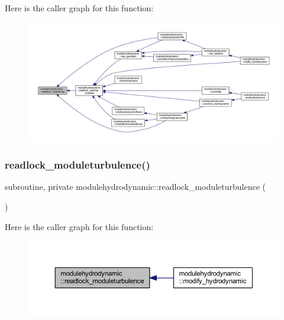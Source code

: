 Here is the caller graph for this function\+:\nopagebreak
\begin{figure}[H]
\begin{center}
\leavevmode
\includegraphics[width=350pt]{namespacemodulehydrodynamic_aefa0a7b600df8e249667d3541b45ecf1_icgraph}
\end{center}
\end{figure}
\mbox{\label{namespacemodulehydrodynamic_aca47e0fe75006cf9be3be10af982ba2c}} 
\subsubsection{\texorpdfstring{readlock\+\_\+moduleturbulence()}{readlock\_moduleturbulence()}}
{\footnotesize\ttfamily subroutine, private modulehydrodynamic\+::readlock\+\_\+moduleturbulence (\begin{DoxyParamCaption}{ }\end{DoxyParamCaption})\hspace{0.3cm}{\ttfamily [private]}}

Here is the caller graph for this function\+:\nopagebreak
\begin{figure}[H]
\begin{center}
\leavevmode
\includegraphics[width=350pt]{namespacemodulehydrodynamic_aca47e0fe75006cf9be3be10af982ba2c_icgraph}
\end{center}
\end{figure}
\mbox{\label{namespacemodulehydrodynamic_af607bb807c6d67a54a48586646880d77}} 
